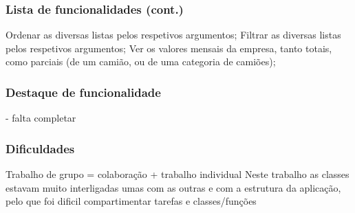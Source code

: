 \documentclass{beamer}
\def\\{}
\begin{document}
\begin{frame}
\frametitle{Lista de funcionalidades (cont.)} 
Ordenar as diversas listas pelos respetivos argumentos;\\
Filtrar as diversas listas pelos respetivos argumentos;\\
Ver os valores mensais da empresa, tanto totais, como parciais (de um camião, ou de uma categoria de camiões);
\end{frame}

\begin{frame}
\frametitle{Destaque de funcionalidade}
 - falta completar

\end{frame}

\begin{frame}
\frametitle{Dificuldades}
Trabalho de grupo = colaboração + trabalho individual\\
Neste trabalho as classes estavam muito interligadas umas com as outras e com a estrutura da aplicação, pelo que foi dificil compartimentar tarefas e classes/funções
\end{frame}
\end{document}
